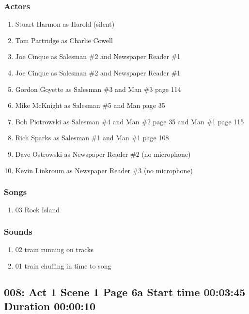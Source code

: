 \subsubsection{Actors}
\begin{enumerate}
\item Stuart Harmon as Harold (silent)
\item Tom Partridge as Charlie Cowell
\item Joe Cinque as Salesman \#2 and Newspaper Reader \#1
\item Joe Cinque as Salesman \#2 and Newspaper Reader \#1
\item Gordon Goyette as Salesman \#3 and Man \#3 page 114
\item Mike McKnight as Salesman \#5 and Man page 35
\item Bob Piotrowski as Salesman \#4 and Man \#2 page 35 and Man \#1 page 115
\item Rich Sparks as Salesman \#1 and Man \#1 page 108
\item Dave Ostrowski as Newspaper Reader \#2 (no microphone)
\item Kevin Linkroum as Newspaper Reader \#3 (no microphone)
\end{enumerate}

\subsubsection{Songs}
\begin{enumerate}
\item 03 Rock Island
\end{enumerate}\subsubsection{Sounds}
\begin{enumerate}
\item 02 train running on tracks
\item 01 train chuffing in time to song
\end{enumerate}
\subsection{008: Act 1 Scene 1 Page 6a Start time 00:03:45 Duration 00:00:10}


